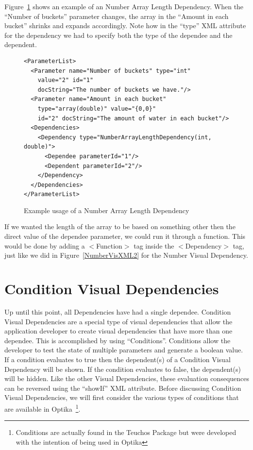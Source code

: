 Figure~\ref{ArrayLengthXML} shows an example of an Number Array Length Dependency. When the ``Number of buckets'' parameter changes, the array in the ``Amount
in each bucket'' shrinks and expands accordingly. Note how in the ``type'' XML attribute for the dependency we had to specify both the type of the dependee and the
dependent. 
\begin{figure}
\centering
{\footnotesize
\begin{verbatim}
<ParameterList>
  <Parameter name="Number of buckets" type="int"
    value="2" id="1" 
    docString="The number of buckets we have."/>
  <Parameter name="Amount in each bucket" 
    type="array(double)" value="{0,0}"
    id="2" docString="The amount of water in each bucket"/>
  <Dependencies>
    <Dependency type="NumberArrayLengthDependency(int, double)">
      <Dependee parameterId="1"/>
      <Dependent parameterId="2"/>
    </Dependency>
  </Dependencies>
</ParameterList>
\end{verbatim}
}
\caption{Example usage of a Number Array Length Dependency}
\label{ArrayLengthXML}
\end{figure}

If we wanted the length of the array to be based on something other then the direct value of the dependee parameter, we could run it through a function. This would 
be done by adding a $<$Function$>$ tag inside the $<$Dependency$>$ tag, just like we did in Figure~\ref{NumberVisXML2} for the Number Visual Dependency.

\section{Condition Visual Dependencies}
Up until this point, all Dependencies have had a single dependee. Condition Visual Dependencies are a special type of visual dependencies that allow the application developer to
create visual dependencies that have more than one dependee. This is accomplished by using ``Conditions''. Conditions allow the developer to test the state of multiple 
parameters and generate a boolean value. If a condition evaluates to true then the dependent(s) of a Condition Visual Dependency will be shown. If the condition evaluates to 
false, the dependent(s) will be hidden. Like the other Visual Dependencies, these evaluation consequences can be reversed using the ``showIf'' XML attribute.  Before discussing 
Condition Visual Dependencies, we will first consider the various types of conditions that are available in Optika~\footnote{Conditions are actually found in the Teuchos Package 
but were developed with the intention of being used in Optika}.

